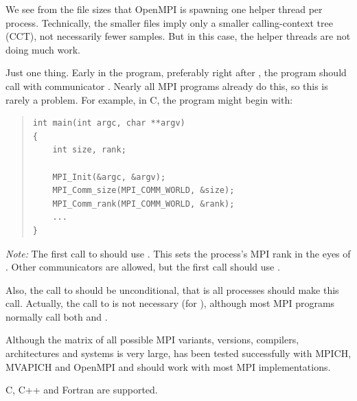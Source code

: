 \documentclass[11pt,twoside,letterpaper]{report}
\begin{document}
We see from the file sizes that OpenMPI is spawning one helper thread per process.
Technically, the smaller  files imply only a smaller calling-context tree (CCT), not necessarily fewer samples.
But in this case, the helper threads are not doing much work.


\vspace{1ex}


\answer{}
Just one thing.
Early in the program, preferably right after , the program should call  with communicator .
Nearly all MPI programs already do this, so this is rarely a problem.
For example, in C, the program might begin with:
%
\begin{quote}
\begin{verbatim}
int main(int argc, char **argv)
{
    int size, rank;

    MPI_Init(&argc, &argv);
    MPI_Comm_size(MPI_COMM_WORLD, &size);
    MPI_Comm_rank(MPI_COMM_WORLD, &rank);
    ...
}
\end{verbatim}
\end{quote}

\emph{Note:} The first call to  should use .
This sets the process's MPI rank in the eyes of \hpcrun{}.
Other communicators are allowed, but the first call should use .

Also, the call to  should be unconditional, that is all processes should make this call.
Actually, the call to  is not necessary (for \hpcrun{}), although most MPI programs normally call both  and .

\vspace{1ex}


\answer{}
Although the matrix of all possible MPI variants, versions, compilers, architectures and systems is very large, \HPCToolkit{} has been tested successfully with MPICH, MVAPICH and OpenMPI and should work with most MPI implementations.

\vspace{1ex}


\answer{}
C, C++ and Fortran are supported.
\end{document}
